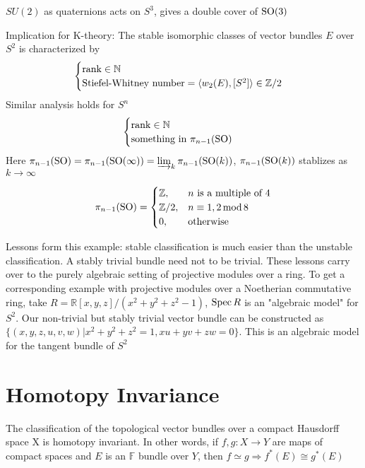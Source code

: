 \documentclass[main]{subfiles}
\begin{document}
\begin{note}
$SU(2)$ as quaternions acts on $S^3$, gives a double cover of $\operatorname{SO}(3)$
\end{note}

Implication for K-theory: The stable isomorphic classes of vector bundles $E$ over $S^2$ is characterized by
\[
\begin{cases}
\operatorname{rank}\in\mathbb N \\
\text{Stiefel-Whitney number} = \langle w_2(E),[S^2]\rangle\in\mathbb Z/2
\end{cases}
\]
Similar analysis holds for $S^n$
\[
\begin{cases}
\operatorname{rank}\in\mathbb N \\
\text{something in } \pi_{n-1}(\operatorname{SO})
\end{cases}
\]
Here $\pi_{n-1}(\operatorname{SO})=\pi_{n-1}(\operatorname{SO}(\infty))=\varinjlim_k\pi_{n-1}(\operatorname{SO}(k))$, $\pi_{n-1}(\operatorname{SO}(k))$ stablizes as $k\to\infty$

\begin{theorem}
\[
\pi_{n-1}(\operatorname{SO})=\begin{cases}
\mathbb Z,&n\text{ is a multiple of }4 \\
\mathbb Z/2,&n\equiv1,2\,\mathrm{mod}\,8 \\
0,&\text{otherwise}
\end{cases}
\]
\end{theorem}

Lessons form this example: stable classification is much easier than the unstable classification. A stably trivial bundle need not to be trivial. These lessons carry over to the purely algebraic setting of projective modules over a ring. To get a corresponding example with projective modules over a Noetherian commutative ring, take $R=\mathbb R[x,y,z]/(x^2+y^2+z^2-1)$, $\operatorname{Spec} R$ is an "algebraic model" for $S^2$. Our non-trivial but stably trivial vector bundle can be constructed as $\{(x,y,z,u,v,w)|x^2+y^2+z^2=1,xu+yv+zw=0\}$. This is an algebraic model for the tangent bundle of $S^2$

\section{Homotopy Invariance}

\begin{theorem}\label{theorem1 - 1/29/2021}
The classification of the topological vector bundles over a compact Hausdorff space X is homotopy invariant. In other words, if $f,g:X\to Y$ are maps of compact spaces and $E$ is an $\mathbb F$ bundle over $Y$, then $f\simeq g\Rightarrow f^*(E)\cong g^*(E)$
\end{theorem}
\end{document}
